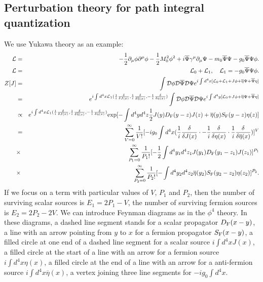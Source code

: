\subsection{Perturbation theory for path integral quantization}
We use Yukawa theory as an example:
\begin{eqnarray}
\mathcal{L} &=& -\frac{1}{2}\partial_{\mu} \phi \partial^{\mu} \phi -\frac{1}{2}M_0^2 \phi^2 + i\overline{\Psi} \gamma^{\mu} \partial_{\mu} \Psi - m_0\overline{\Psi}\Psi -g_0 \overline{\Psi}\Psi\phi. \nonumber \\
\mathcal{L} &=& \mathcal{L}_0 + \mathcal{L}_1 , \quad \mathcal{L}_1 =- g_0\overline{\Psi}\Psi\phi .\nonumber \\
Z[J] &=& \int \mathcal{D}\phi \mathcal{D}\overline{\Psi} \mathcal{D}\Psi e^{i\int d^4x [\mathcal{L}_0 + \mathcal{L}_1 + J\phi + \overline{\eta}\Psi +  \overline{\Psi}\eta]} \nonumber \\
&=& e^{i\int d^4x \mathcal{L}_1(\frac{1}{i} \frac{\delta}{\delta J(x)},\frac{1}{i}\frac{\delta}{\delta \overline{\eta}(x)},-\frac{1}{i}\frac{\delta}{\delta \eta(x)})} \int \mathcal{D}\phi \mathcal{D}\overline{\Psi} \mathcal{D}\Psi e^{i\int d^4y [\mathcal{L}_0 + J\phi + \overline{\eta}\Psi +  \overline{\Psi}\eta]} \nonumber \\
&\propto & e^{i\int d^4x \mathcal{L}_1(\frac{1}{i} \frac{\delta}{\delta J(x)},\frac{1}{i}\frac{\delta}{\delta \overline{\eta}(x)},-\frac{1}{i}\frac{\delta}{\delta \eta(x)})} \mathrm{exp} [- \int d^4y d^4z  \frac{1}{2} J(y)D_{\rm F}(y-z)J(z) + \overline{\eta}(y)S_{\rm F}(y-z)\eta(z)] \nonumber \\
& =& \sum_{V=0}^{\infty} \frac{1}{V!} [-ig_0 \int d^4x (\frac{1}{i} \frac{\delta}{\delta J(x)}  \cdot -\frac{1}{i}\frac{\delta}{\delta \eta(x)} \cdot \frac{1}{i}\frac{\delta}{\delta \overline{\eta}(x)})]^V \nonumber \\
&\times & \sum_{P_1=0}^{\infty} \frac{1}{P_1!} [-\frac{1}{2} \int d^4y_1 d^4z_1 J(y_1)D_{\rm F}(y_1-z_1)J(z_1)]^{P_1} \nonumber \\
&\times &  \sum_{P_2=0}^{\infty} \frac{1}{P_2!} [-\int d^4y_2 d^4z_2 \overline{\eta}(y_2)S_{\rm F}(y_2-z_2)\eta(z_2)]^{P_2} .\nonumber
\end{eqnarray}
If we focus on a term with particular values of $V$, $P_1$ and $P_2$, then the number of surviving scalar sources is $E_1 = 2P_1-V$, the number of surviving fermion sources is $E_2 = 2P_2-2V$.
We can introduce Feynman diagrams as in the $\phi^4$ theory. In these diagrams, a dashed line segment stands for a scalar propagator $D_{\rm F}(x-y)$, a line with an arrow pointing from $y$ to $x$ for a fermion propagator $S_{\rm F}(x-y)$, a filled circle at one end of a dashed line segment for a scalar source $i\int d^4x J(x)$, a filled circle at the start of a line with an arrow for a fermion source $i\int d^4x \eta(x)$, a filled circle at the end of a line with an arrow for a anti-fermion source $i\int d^4x \overline{\eta}(x)$, a vertex joining three line segments for $-ig_0\int d^4x$.

